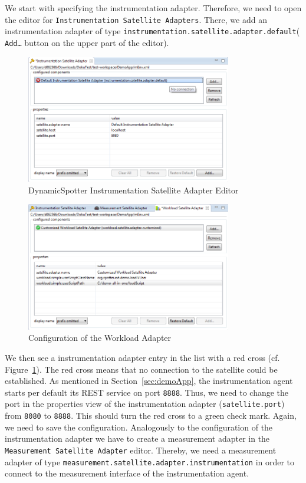 \documentclass{report}
\newcommand{\DS}{DynamicSpotter }
\begin{document}
We start with specifying the instrumentation adapter. Therefore, we need to open the editor for \texttt{Instrumentation
Satellite Adapters}. There, we add an instrumentation adapter of type
\texttt{instrumentation.satellite.adapter.default}( \texttt{Add\ldots} button on the upper part of the editor).
\begin{figure}[h]
\centering
\includegraphics[width=0.8\textwidth]{figures/demo/0007-instrumentationEditor.png}
\caption{\DS Instrumentation Satellite Adapter Editor}
\label{fig:instrumentationEditor}
\end{figure}
\begin{figure}[h]
\centering
\includegraphics[width=0.8\textwidth]{figures/demo/0012-workloadConfig.png}
\caption{Configuration of the Workload Adapter}
\label{fig:workloadConfig}
\end{figure}
We then see a instrumentation adapter entry in the list with a red cross (cf. Figure~\ref{fig:instrumentationEditor}).
The red cross means that no connection to the satellite could be established. As mentioned in Section~\ref{sec:demoApp}, the instrumentation agent starts per default
its REST service on port \texttt{8888}. Thus, we need to change the port in the properties view of the
instrumentation adapter (\texttt{satellite.port}) from \texttt{8080} to \texttt{8888}. This should turn the red cross to
a green check mark. Again, we need to save the configuration.
Analogously to the configuration of the instrumentation adapter we have to create a measurement adapter in the
\texttt{Measurement Satellite Adapter} editor. Thereby, we need a measurement adapter of type
\texttt{measurement.satellite.adapter.instrumentation} in order to connect to the measurement interface of the
instrumentation agent. 
\end{document}
